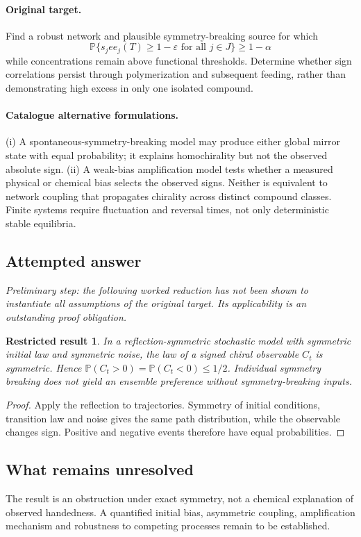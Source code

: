\documentclass[11pt]{article}
\newcommand{\Prob}{\mathbb P}
\providecommand{\Prob}{\mathbb P}
\newtheorem{attemptresult}{Restricted result}[section]
\begin{document}
\paragraph{Original target.}
Find a robust network and plausible symmetry-breaking source for which
\[
\Prob\{s_jee_j(T)\geq1-\varepsilon\text{ for all }j\in J\}\geq1-\alpha
\]
while concentrations remain above functional thresholds. Determine whether sign correlations persist through polymerization and subsequent feeding, rather than demonstrating high excess in only one isolated compound.
\paragraph{Catalogue alternative formulations.}
(i) A spontaneous-symmetry-breaking model may produce either global mirror state with equal probability; it explains homochirality but not the observed absolute sign. (ii) A weak-bias amplification model tests whether a measured physical or chemical bias selects the observed signs. Neither is equivalent to network coupling that propagates chirality across distinct compound classes. Finite systems require fluctuation and reversal times, not only deterministic stable equilibria.
\subsection{Attempted answer}
\noindent\emph{Preliminary step: the following worked reduction has not been shown to instantiate all assumptions of the original target. Its applicability is an outstanding proof obligation.}

\begin{attemptresult}
In a reflection-symmetric stochastic model with symmetric initial law and symmetric noise, the law of a signed chiral observable $C_t$ is symmetric. Hence $\Prob(C_t>0)=\Prob(C_t<0)\leq1/2$. Individual symmetry breaking does not yield an ensemble preference without symmetry-breaking inputs.
\end{attemptresult}
\begin{proof}
Apply the reflection to trajectories. Symmetry of initial conditions, transition law and noise gives the same path distribution, while the observable changes sign. Positive and negative events therefore have equal probabilities.
\end{proof}
\subsection{What remains unresolved}
The result is an obstruction under exact symmetry, not a chemical explanation of observed handedness. A quantified initial bias, asymmetric coupling, amplification mechanism and robustness to competing processes remain to be established.
\end{document}
